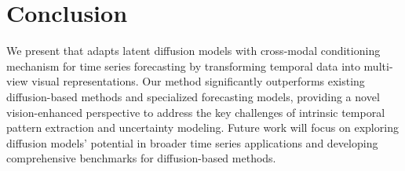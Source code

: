 \section{Conclusion}
We present \model that adapts latent diffusion models with cross-modal conditioning mechanism for time series forecasting by transforming temporal data into multi-view visual representations. Our method significantly outperforms existing diffusion-based methods and specialized forecasting models, providing a novel vision-enhanced perspective to address the key challenges of intrinsic temporal pattern extraction and uncertainty modeling. Future work will focus on exploring diffusion models' potential in broader time series applications and developing comprehensive benchmarks for diffusion-based methods.